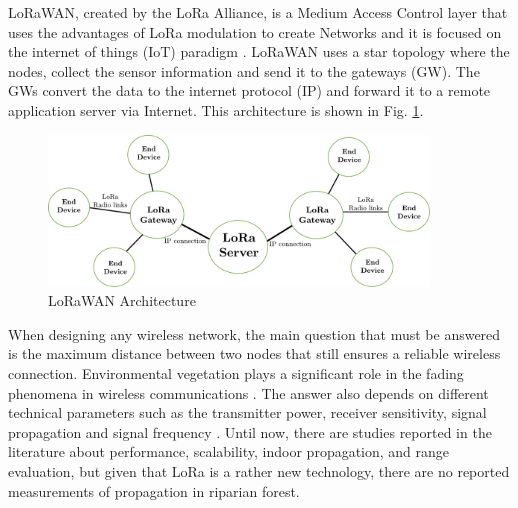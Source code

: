 LoRaWAN, created by the LoRa Alliance, is a Medium Access Control layer that uses the advantages of LoRa modulation to create Networks and it is focused on the internet of things (IoT) paradigm \cite{Wixted2017}. LoRaWAN uses a star topology where the nodes, collect the sensor information and send it to the gateways (GW). The GWs convert the data to the internet protocol (IP) and forward it to a remote application server via Internet. This architecture is shown in Fig. \ref{fig:lorawanarchitecture}.

\begin{figure}[h!]
  \centering
  \includegraphics[width=0.9\textwidth]{Figure1}
  \caption{LoRaWAN Architecture \cite{Vangelista2015}}
  \label{fig:lorawanarchitecture}
\end{figure}


When designing any wireless network, the main question that must be answered is the maximum distance between two nodes that still ensures a reliable wireless connection. Environmental vegetation plays a significant role in the fading phenomena in wireless communications \cite{Meng2008}. The answer also depends on different technical parameters such as the transmitter power, receiver sensitivity, signal propagation and signal frequency \cite{Harvanova2011}. Until now, there are studies reported in the literature about performance, scalability, indoor propagation, and range evaluation, but given that LoRa is a rather new technology, there are no reported measurements of propagation in riparian forest.



